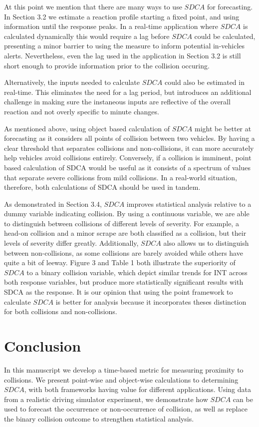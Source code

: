 \documentclass{article}
\begin{document}
At this point we mention that there are many ways to use $SDCA$ for forecasting.  In Section 3.2 we estimate a reaction profile starting a fixed point, and using information until the response peaks.  In a real-time application where $SDCA$ is calculated dynamically this would require a lag before $SDCA$ could be calculated, presenting a minor barrier to using the measure to inform potential in-vehicles alerts.  Nevertheless, even the lag used in the application in Section 3.2 is still short enough to provide information prior to the collision occuring.  

Alternatively, the inputs needed to calculate $SDCA$ could also be estimated in real-time. This eliminates the need for a lag period, but introduces an additional challenge in making sure the instaneous inputs are reflective of the overall reaction and not overly specific to minute changes.

As mentioned above, using object based calculation of $SDCA$ might be better at forecasting as it considers all points of collision between two vehicles. By having a clear threshold that separates collisions and non-collisions, it can more accurately help vehicles avoid collisions entirely. Conversely, if a collision is imminent, point based calculation of SDCA would be useful as it consists of a spectrum of values that separate severe collisions from mild collisions. In a real-world situation, therefore, both calculations of SDCA should be used in tandem.

As demonstrated in Section 3.4, $SDCA$ improves statistical analysis relative to a dummy variable indicating collision. By using a continuous variable, we are able to distinguish between collisions of different levels of severity. For example, a head-on collision and a minor scrape are both classified as a collision, but their levels of severity differ greatly. Additionally, $SDCA$ also allows us to distinguish between non-collisions, as some collisions are barely avoided while others have quite a bit of leeway.  Figure 3 and Table 1 both illustrate the superiority of $SDCA$ to a binary collision variable, which depict similar trends for INT across both response variables, but produce more statistically significant results with SDCA as the response. It is our opinion that using the point framework to calculate $SDCA$ is better for analysis because it incorporates theses distinction for both collisions and non-collisions.

\section{Conclusion}

In this manuscript we develop a time-based metric for measuring proximity to collisions. We present point-wise and object-wise calculations to determining $SDCA$, with both frameworks having value for different applications. Using data from a realistic driving simulator experiment, we demonstrate how $SDCA$ can be used to forecast the occurrence or non-occurrence of collision, as well as replace the binary collision outcome to strengthen statistical analysis.


 
\end{document}
